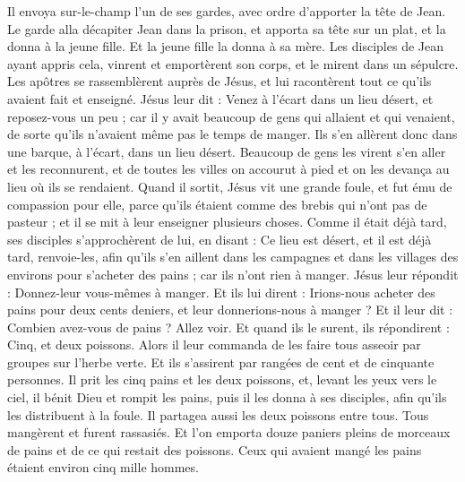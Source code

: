 \begin{multicols}{2}
Il envoya sur-le-champ l’un de ses gardes, avec ordre d'apporter la tête de Jean.
Le garde alla décapiter Jean dans la prison, et apporta sa tête sur un plat, et la donna à la jeune fille. Et la jeune fille la donna à sa mère.
Les disciples de Jean ayant appris cela, vinrent et emportèrent son corps, et le mirent dans un sépulcre.
Les apôtres se rassemblèrent auprès de Jésus, et lui racontèrent tout ce qu'ils avaient fait et enseigné.
Jésus leur dit : Venez à l'écart dans un lieu désert, et reposez-vous un peu ; car il y avait beaucoup de gens qui allaient et qui venaient, de sorte qu'ils n'avaient même pas le temps de manger.
Ils s'en allèrent donc dans une barque, à l’écart, dans un lieu désert.
Beaucoup de gens les virent s’en aller et les reconnurent, et de toutes les villes on accourut à pied et on les devança au lieu où ils se rendaient.
Quand il sortit, Jésus vit une grande foule, et fut ému de compassion pour elle, parce qu’ils étaient comme des brebis qui n'ont pas de pasteur ; et il se mit à leur enseigner plusieurs choses.
Comme il était déjà tard, ses disciples s'approchèrent de lui, en disant : Ce lieu est désert, et il est déjà tard,
renvoie-les, afin qu’ils s'en aillent dans les campagnes et dans les villages des environs pour s’acheter des pains ; car ils n'ont rien à manger.
Jésus leur répondit : Donnez-leur vous-mêmes à manger. Et ils lui dirent : Irions-nous acheter des pains pour deux cents deniers, et leur donnerions-nous à manger ?
Et il leur dit : Combien avez-vous de pains ? Allez voir. Et quand ils le surent, ils répondirent : Cinq, et deux poissons.
Alors il leur commanda de les faire tous asseoir par groupes sur l'herbe verte.
Et ils s'assirent par rangées de cent et de cinquante personnes.
Il prit les cinq pains et les deux poissons, et, levant les yeux vers le ciel, il bénit Dieu et rompit les pains, puis il les donna à ses disciples, afin qu'ils les distribuent à la foule. Il partagea aussi les deux poissons entre tous.
Tous mangèrent et furent rassasiés.
Et l’on emporta douze paniers pleins de morceaux de pains et de ce qui restait des poissons.
Ceux qui avaient mangé les pains étaient environ cinq mille hommes.
\end{multicols}
